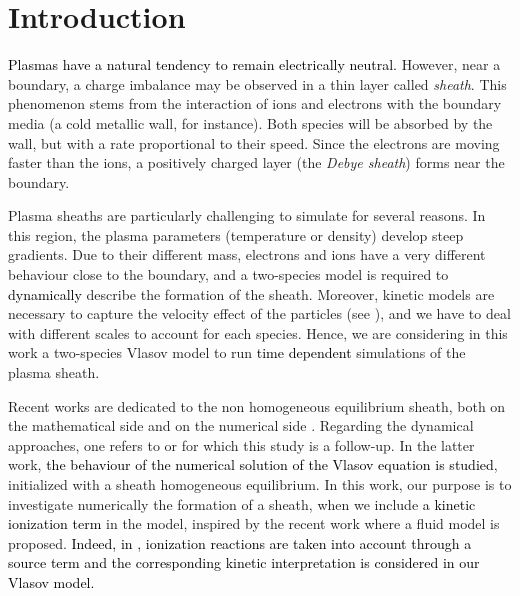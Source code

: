 \documentclass{article}
\numberwithin{equation}{section}
\begin{document}
\section*{Introduction}
\textcolor{black}{Plasmas have a natural tendency to remain electrically neutral.}
However, near a boundary, a charge imbalance may be observed in a thin layer called \emph{sheath}.
This phenomenon stems from the interaction of ions and electrons with the boundary media (a cold metallic wall, for instance). Both species will be absorbed by the wall, but with a rate proportional to their speed. Since the electrons are moving %
faster than the ions, a positively charged layer (the \emph{Debye sheath}) forms near the boundary. 

Plasma sheaths are particularly challenging to simulate for several reasons. In this region, 
the plasma parameters (temperature or density) develop steep gradients. Due to their different mass, 
electrons and ions have a very different behaviour close to the boundary, and a two-species model is required 
to \textcolor{black}{dynamically} describe the formation of the sheath. Moreover, kinetic models are necessary to capture the velocity 
effect of the particles (see \cite{riemannBohmCriterionSheath1991, Sun22, cagas2018}), and we have to deal with %
different scales to account for each species.  Hence, we are considering in this work 
a two-species Vlasov model to run \textcolor{black}{time dependent} simulations of the plasma sheath. 

Recent works are dedicated to the non homogeneous equilibrium sheath, both on the mathematical side and on the numerical side \cite{despresMinimizationFormulationBikinetic2016, badsiCollisionalSheathSolutions2021, badsiStableFixedPoint2021}. 
Regarding the dynamical approaches, one refers to \cite{couletteEulerianVlasovCode2014,bourneNonUniformSplinesSemiLagrangian2022} 
or \cite{badsiNumericalStabilityPlasma2018} for which this study is a follow-up. 
In the latter work, \textcolor{black}{the behaviour of the numerical solution of the Vlasov equation is studied}, initialized with a sheath
homogeneous equilibrium. In this work, our purpose is to investigate numerically the formation of a sheath,  
when we include \textcolor{black}{a kinetic ionization term} in the model, inspired by the recent work
\cite{alvarezlagunaAsymptoticPreservingWellbalanced2020} where a fluid model is proposed.    
\textcolor{black}{Indeed, in \cite{alvarezlagunaAsymptoticPreservingWellbalanced2020}, ionization reactions are taken into account through a 
source term and the corresponding kinetic interpretation is considered in our Vlasov model. }
\end{document}
